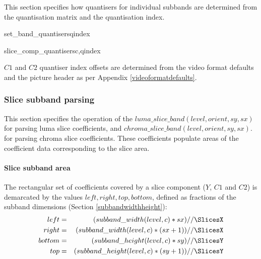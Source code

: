 This section specifies how quantisers for individual subbands are determined from the quantisation matrix
and the quantisation index.

\begin{pseudo}{set\_band\_quantisers}{qindex}
\end{pseudo}

\begin{pseudo}{slice\_comp\_quantisers}{c,qindex}
\bsEND
\end{pseudo}

$C1$ and $C2$ quantiser index offsets are determined from the video format defaults and the picture header
as per Appendix \ref{videoformatdefaults}.

\subsubsection{Slice subband parsing}
\label{sliceband}

This section specifies the operation of the $luma\_slice\_band( level,orient,sy,sx)$ for 
parsing luma slice coefficients, and $chroma\_slice\_band( level,orient,sy,sx)$. for 
parsing chroma slice coefficients.
These coefficients populate areas of the coefficient data corresponding to the slice area.

\paragraph{Slice subband area\\}

The rectangular set of coefficients covered by a slice component ($Y$, $C1$ and $C2$) 
is demarcated by the values $left, right, top, bottom$, defined as fractions
of the subband dimensions (Section \ref{subbandwidthheight}):
\begin{eqnarray*}
  left & = & (subband\_width(level,c)*sx)//\SlicesX \\
  right & = & (subband\_width(level,c)*(sx+1))//\SlicesX \\
  bottom & = & (subband\_height(level,c)*sy)//\SlicesY \\
  top & = & (subband\_height(level,c)*(sy+1))//\SlicesY
\end{eqnarray*}

